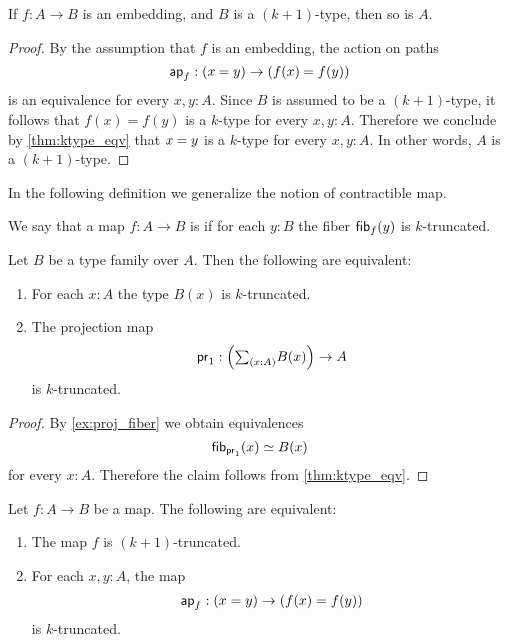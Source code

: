 \begin{cor}\label{cor:emb_into_ktype}
If $f:A\to B$ is an embedding, and $B$ is a $(k+1)$-type, then so is $A$.
\end{cor}

\begin{proof}
By the assumption that $f$ is an embedding, the action on paths
\begin{equation*}
\apfunc{f}:(\id{x}{y})\to (\id{f(x)}{f(y)})
\end{equation*}
is an equivalence for every $x,y:A$. Since $B$ is assumed to be a $(k+1)$-type, it follows that $f(x)=f(y)$ is a $k$-type for every $x,y:A$. Therefore we conclude by \cref{thm:ktype_eqv} that $\id{x}{y}$ is a $k$-type for every $x,y:A$. In other words, $A$ is a $(k+1)$-type.
\end{proof}

In the following definition we generalize the notion of contractible map.

\begin{defn}
We say that a map $f:A\to B$ is  if for each $y:B$ the fiber $\mathsf{fib}_{f}(y)$ is $k$-truncated.
\end{defn}

\begin{thm}
Let $B$ be a type family over $A$. Then the following are equivalent:
\begin{enumerate}
\item For each $x:A$ the type $B(x)$ is $k$-truncated.
\item The projection map
\begin{equation*}
\proj 1 : \Big(\sm{x:A}B(x)\Big)\to A
\end{equation*}
is $k$-truncated.
\end{enumerate}
\end{thm}

\begin{proof}
By \cref{ex:proj_fiber} we obtain equivalences
\begin{equation*}
\eqv{\fib{\proj 1}{x}}{B(x)}
\end{equation*}
for every $x:A$. Therefore the claim follows from \cref{thm:ktype_eqv}.
\end{proof}

\begin{thm}\label{thm:trunc_ap}
Let $f:A\to B$ be a map. The following are equivalent:
\begin{enumerate}
\item The map $f$ is $(k+1)$-truncated.
\item For each $x,y:A$, the map
\begin{equation*}
\mathsf{ap}_{f} : (x=y)\to (f(x)=f(y))
\end{equation*}
is $k$-truncated. 
\end{enumerate}
\end{thm}

